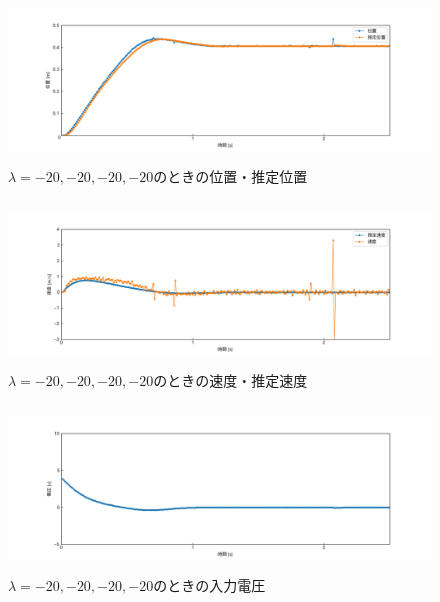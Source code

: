 \documentclass[12pt]{jsarticle}
\begin{document}
\begin{figure}[H]
  \begin{center}
    \includegraphics[clip,width=13.0cm, height=4.4cm]{../img/Exp11-1.png}
    \caption{$\lambda=-20, -20, -20, -20$のときの位置・推定位置}
    \label{Exp11-1}
  \end{center}
\end{figure}
\begin{figure}[H]
  \begin{center}
    \includegraphics[clip,width=13.0cm, height=4.4cm]{../img/Exp11-2.png}
    \caption{$\lambda=-20, -20, -20, -20$のときの速度・推定速度}
    \label{Exp11-2}
  \end{center}
\end{figure}
\begin{figure}[H]
  \begin{center}
    \includegraphics[clip,width=13.0cm, height=4.4cm]{../img/Exp11-3.png}
    \caption{$\lambda=-20, -20, -20, -20$のときの入力電圧}
    \label{Exp11-3}
  \end{center}
\end{figure}
\end{document}
